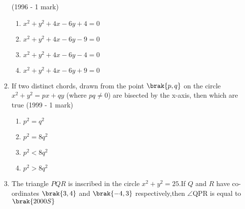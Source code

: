 \begin{enumerate}
    \hfill {(1996 - 1 mark)}
    \begin{enumerate}
    	\item $x^{2}+y^{2}+4x-6y+4=0$
    	\item $x^{2}+y^{2}+4x-6y-9=0$
    	\item $x^{2}+y^{2}+4x-6y-4=0$
    	\item $x^{2}+y^{2}+4x-6y+9=0$
    \end{enumerate}
    \item If two distinct chords, drawn from the point $\brak{p,q}$ on the circle $x^{2}+y^{2}=px+qy$ (where $pq \neq 0$) are bisected by the x-axis, then which are true
    \hfill {(1999 - 1 mark)}
    \begin{enumerate}
    	\item $p^{2}=q^{2}$
    	\item $p^{2}=8q^{2}$ 
    	\item $p^{2}<8q^{2}$
    	\item $p^{2}>8q^{2}$
    \end{enumerate}
        \item The triangle $PQR$ is inscribed in the circle $x^2+y^2=25$.If $Q$ and $R$ have co-ordinates $\brak{3,4}$ and $\brak{-4,3}$ respectively,then $\angle$QPR is equal to  
    \hfill$\brak{2000S}$
    
    
    \begin{multicols}{2}
    \begin{enumerate}
    

\end{enumerate}
\end{multicols}
\end{enumerate}
